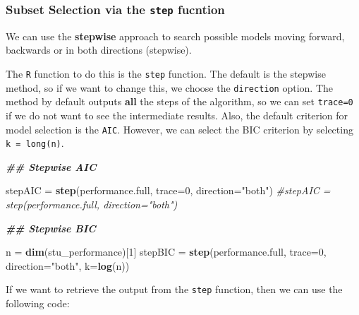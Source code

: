 \documentclass[
]{book}
\newenvironment{Shaded}{\begin{snugshade}}{\end{snugshade}}
\newcommand{\AttributeTok}[1]{\textcolor[rgb]{0.13,0.29,0.53}{#1}}
\newcommand{\CommentTok}[1]{\textcolor[rgb]{0.56,0.35,0.01}{\textit{#1}}}
\newcommand{\DecValTok}[1]{\textcolor[rgb]{0.00,0.00,0.81}{#1}}
\newcommand{\DocumentationTok}[1]{\textcolor[rgb]{0.56,0.35,0.01}{\textbf{\textit{#1}}}}
\newcommand{\FunctionTok}[1]{\textcolor[rgb]{0.13,0.29,0.53}{\textbf{#1}}}
\newcommand{\NormalTok}[1]{#1}
\newcommand{\OtherTok}[1]{\textcolor[rgb]{0.56,0.35,0.01}{#1}}
\newcommand{\SpecialCharTok}[1]{\textcolor[rgb]{0.81,0.36,0.00}{\textbf{#1}}}
\newcommand{\StringTok}[1]{\textcolor[rgb]{0.31,0.60,0.02}{#1}}
\begin{document}
\subsubsection{\texorpdfstring{Subset Selection via the \texttt{step} fucntion}{Subset Selection via the step fucntion}}\label{subset-selection-via-the-step-fucntion}

We can use the \textbf{stepwise} approach to search possible models moving forward, backwards or in both directions (stepwise).

The \texttt{R} function to do this is the \texttt{step} function. The default is the stepwise method, so if we want to change this, we choose the \texttt{direction} option. The method by default outputs \textbf{all} the steps of the algorithm, so we can set \texttt{trace=0} if we do not want to see the intermediate results. Also, the default criterion for model selection is the \texttt{AIC}. However, we can select the BIC criterion by selecting \texttt{k\ =\ long(n)}.

\begin{Shaded}
\begin{Highlighting}[]
\DocumentationTok{\#\# Stepwise AIC}

\NormalTok{stepAIC }\OtherTok{=} \FunctionTok{step}\NormalTok{(performance.full, }\AttributeTok{trace=}\DecValTok{0}\NormalTok{, }\AttributeTok{direction=}\StringTok{"both"}\NormalTok{)  }
\CommentTok{\#stepAIC = step(performance.full, direction="both")}
\end{Highlighting}
\end{Shaded}

\begin{Shaded}
\begin{Highlighting}[]
\DocumentationTok{\#\# Stepwise BIC}

\NormalTok{n }\OtherTok{=} \FunctionTok{dim}\NormalTok{(stu\_performance)[}\DecValTok{1}\NormalTok{]}
\NormalTok{stepBIC }\OtherTok{=} \FunctionTok{step}\NormalTok{(performance.full, }\AttributeTok{trace=}\DecValTok{0}\NormalTok{, }\AttributeTok{direction=}\StringTok{"both"}\NormalTok{, }\AttributeTok{k=}\FunctionTok{log}\NormalTok{(n))      }
\end{Highlighting}
\end{Shaded}

If we want to retrieve the output from the \texttt{step} function, then we can use the following code:

\begin{Shaded}
\end{Shaded}
\end{document}
